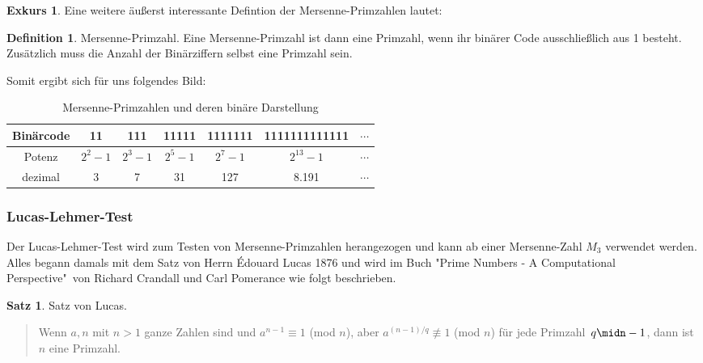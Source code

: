 \documentclass[12pt,a4paper]{article}
\theoremstyle{definition}
\newtheorem{defi}{Definition}[section]
\newtheorem{satz}{Satz}[subsection]
\newtheorem{exkurs}{Exkurs}
\begin{document}
\begin{exkurs}
Eine weitere äußerst interessante Defintion der Mersenne-Primzahlen lautet:
\begin{defi}{Mersenne-Primzahl}.\newline
Eine Mersenne-Primzahl ist dann eine Primzahl, wenn ihr binärer Code ausschließlich aus 1 besteht.\newline
Zusätzlich muss die Anzahl der Binärziffern selbst eine Primzahl sein.
\end{defi}

\newpage
Somit ergibt sich für uns folgendes Bild:
\begin{table}[h]\begin{center}
\begin{tabular}{c|c|c|c|c|c|c}
Binärcode & 11 & 111 & 11111 & 1111111 & 1111111111111 & $\cdots$ \\
\hline
Potenz & $2^2-1$ & $2^3-1$ & $2^5-1$ & $2^7-1$ & $2^{13}-1$ & $\cdots$ \\
\hline
dezimal & 3 & 7 & 31 & 127 & 8.191 & $\cdots$
\end{tabular}\end{center}
\caption{Mersenne-Primzahlen und deren binäre Darstellung}
\label{tab:Mersenne-Primzahlen und deren binäre Darstellung}
\end{table}

\subsubsection{Lucas-Lehmer-Test}\label{Lucas-Lehmer-Test}
Der Lucas-Lehmer-Test wird zum Testen von Mersenne-Primzahlen herangezogen und kann ab einer Mersenne-Zahl $M_3$ verwendet werden.
Alles begann damals mit dem Satz von Herrn Édouard Lucas 1876 und wird im Buch "Prime Numbers - A Computational Perspective"\ von Richard Crandall und Carl Pomerance wie folgt beschrieben.
\begin{satz}{Satz von Lucas}.
\begin{quote}
\small
Wenn $a, n$ mit $n > 1$ ganze Zahlen sind und\newline
$a^{n-1} \equiv 1$ (mod $n$), aber $a^{(n-1)/q} \not\equiv 1$ (mod $n$) für jede Primzahl $q\midn-1$,\newline
dann ist $n$ eine Primzahl.\newline
\autocite[173]{Crandall2005}
\end{quote}
\end{satz}


\end{exkurs}
\end{document}
